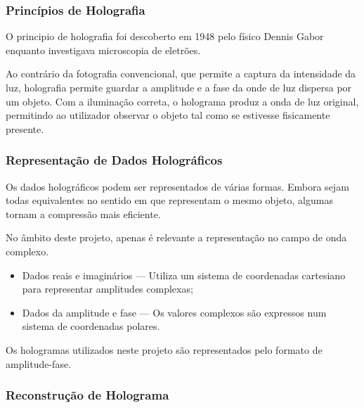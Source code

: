\subsubsection{Princípios de Holografia}
\label{sssec::estado-arte:holografia:principios}

O principio de holografia foi descoberto em 1948 pelo físico Dennis Gabor enquanto investigava microscopia de eletrões.

Ao contrário da fotografia convencional, que permite a captura da intensidade da luz, holografia permite guardar a amplitude e a fase da onde de luz dispersa por um objeto. Com a iluminação correta, o holograma produz a onda de luz original, permitindo ao utilizador observar o objeto tal como se estivesse fisicamente presente.


\subsubsection{Representação de Dados Holográficos}
\label{sssec::estado-arte:holografia:representacao-dados}


Os dados holográficos podem ser representados de várias formas. Embora sejam todas equivalentes no sentido em que representam o mesmo objeto, algumas tornam a compressão mais eficiente. 


No âmbito deste projeto, apenas é relevante a representação no campo de onda complexo.


\begin{itemize}
    \item Dados reais e imaginários --- Utiliza um sistema de coordenadas cartesiano para representar amplitudes complexas;
    \item Dados da amplitude e fase --- Os valores complexos são expressos num sistema de coordenadas polares.
\end{itemize}

Os hologramas utilizados neste projeto são representados pelo formato de amplitude-fase.


\subsubsection{Reconstrução de Holograma}
\label{sssec::estado-arte:holografia:reconstrucao}

